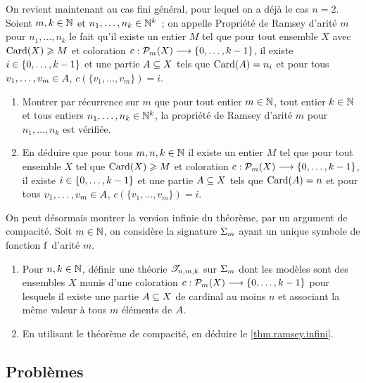 \begin{exercise}
  On revient maintenant au cas fini général, pour lequel on a déjà le cas
  $n = 2$. Soient $m,k \in \mathbb N$ et $n_1,\ldots,n_k \in \mathbb N^k$~; on appelle
  \og Propriété de Ramsey d'arité $m$ pour $n_1,\ldots,n_k$\fg{} le fait qu'il
  existe un entier $M$ tel que pour tout ensemble $X$ avec $\operatorname{Card}(X) \geqslant M$
  et coloration $c : \displaystyle \mathcal{P}_m(X) \longrightarrow \{0,\ldots,k - 1\}$, il existe
  $i \in \{0,\ldots,k - 1\}$ et une partie $A\subseteq X$ tels que
  $\operatorname{Card}(A) = n_i$ et pour tous $v_1,\ldots,v_m \in A$,
  $c(\{v_1,\ldots,v_m\}) = i$.
  \begin{enumerate}[resume]
  \item Montrer par récurrence sur $m$ que pour tout entier $m\in \mathbb N$, tout
    entier $k \in \mathbb N$ et tous entiers $n_1,\ldots,n_k \in \mathbb N^k$,
    la propriété de Ramsey d'arité $m$ pour $n_1,\ldots,n_k$ est vérifiée.
  \item En déduire que pour tous $m,n,k\in \mathbb N$ il existe un entier $M$ tel que
    pour tout ensemble $X$ tel que $\operatorname{Card}(X) \geqslant M$ et coloration
    $c : \displaystyle \mathcal{P}_m(X) \longrightarrow \{0,\ldots,k - 1\}$, il existe
    $i \in \{0,\ldots,k - 1\}$ et une partie $A\subseteq X$ tels que
    $\operatorname{Card}(A) = n$ et pour tous $v_1,\ldots,v_m \in A$,
    $c(\{v_1,\ldots,v_m\}) = i$.
  \end{enumerate}

  On peut désormais montrer la version infinie du théorème, par un argument de
  compacité. Soit $m\in \mathbb N$, on considère la signature $\Sigma_{m}$ ayant
  un unique symbole de fonction $\mathrm{f}$ d'arité $m$.
  \begin{enumerate}[resume]
  \item Pour $n,k\in \mathbb N$, définir une théorie $\mathscr T_{n,m,k}$ sur $\Sigma_{m}$
    dont les modèles sont des ensembles $X$ munis d'une coloration
    $c : \displaystyle \mathcal{P}_m(X) \longrightarrow \{0,\ldots,k - 1\}$ pour lesquels il existe
    une partie $A\subseteq X$ de cardinal au moins $n$ et associant la
    même valeur à tous $m$ éléments de $A$.
  \item En utilisant le théorème de compacité, en déduire le
    \cref{thm.ramsey.infini}.
  \end{enumerate}
\end{exercise}

\clearpage

\subsection{Problèmes}
